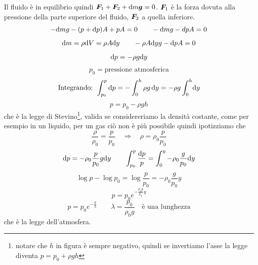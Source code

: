 Il fluido è in equilibrio quindi $\boldsymbol{F}_1+\boldsymbol{F}_2+\mathrm{d} m\boldsymbol{g}=0$. $\boldsymbol{F}_1$ è la forza dovuta alla pressione della parte superiore del fluido, $\boldsymbol{F}_2$ a quella inferiore.
\begin{equation*}-\mathrm{d} mg-(p+\mathrm{d} p)A+pA=0\qquad -\mathrm{d} mg-dpA=0\end{equation*}
\begin{equation*}\mathrm{d} m=\rho \mathrm{d} V=\rho A\mathrm{d} y\qquad -\rho A\mathrm{d} y g-\mathrm{d} p A=0\end{equation*}
\begin{equation*}\mathrm{d} p=-\rho g \mathrm{d} y\end{equation*}
\begin{equation*}p_0=\text{pressione atmosferica}\end{equation*}
\begin{equation*}\text{Integrando: }\int_{p_0}^p \mathrm{d} p=-\int_0^h \rho g\,\mathrm{d} y=-\rho g\int_0^h\!\mathrm{d} y\end{equation*}
\begin{equation*}p=p_0-\rho g h\end{equation*}
che è la legge di Stevino\footnote{notare che $h$ in figura è sempre negativo, quindi se invertiamo l'asse la legge diventa $p=p_0+\rho gh$}, valida se considereriamo la densità costante, come per esempio in un liquido, per un gas ciò non è più possibile quindi ipotizziamo che \begin{equation*}\frac{\rho}{\rho_0}=\frac{p}{p_0}\quad\Rightarrow\quad \rho=\rho_0\frac{p}{p_0}\end{equation*}
\begin{equation*}\mathrm{d} p=-\rho_0\frac{p}{p_0}g\mathrm{d} y\qquad \int_{p_0}^p \frac{\mathrm{d} p}{p}=\int_0^y -\rho_0\frac{g}{p_0}\mathrm{d} y\end{equation*}
\begin{equation*}\log p-\log p_0=\log\frac{p}{p_0}=-\rho_0\frac{g}{p_0}y\end{equation*}
\begin{equation}
p=p_0e^{-\frac{\rho_0 g}{p_0}y}
\label{legge_atmosfera}
\end{equation}
\begin{equation*}p=p_0e^{-\frac{y}{\lambda}}\qquad \lambda=\frac{p_0}{\rho_0 g}\quad \text{è una lunghezza}\end{equation*}
che è la legge dell'atmosfera.


